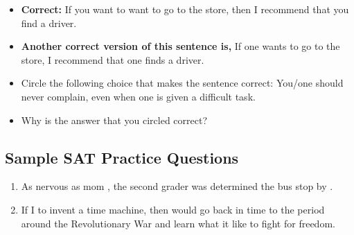 \begin{itemize}
\item{\textbf{Correct:} If you want to want to go to the store, then I recommend that you find a driver.}
\item{\textbf{Another correct version of this sentence is,} If one wants to go to the store, I recommend that
one finds a driver.}
\item{Circle the following choice that makes the sentence correct: You/one should never complain, even when one is given a difficult task.}
\item{Why is the answer that you circled correct?} \hrulefill
\end{itemize}

\subsection{Sample SAT Practice Questions}

\begin{enumerate}

\item \begin{inparaenum}[A]
As nervous as  mom , the second grader was determined  the bus stop by .
\end{inparaenum}

\item \begin{inparaenum}[A]
If I  to invent a time machine, then  would go back in time to the period around the Revolutionary War and learn  what it  like to fight for freedom. 
\end{inparaenum}

\end{enumerate}